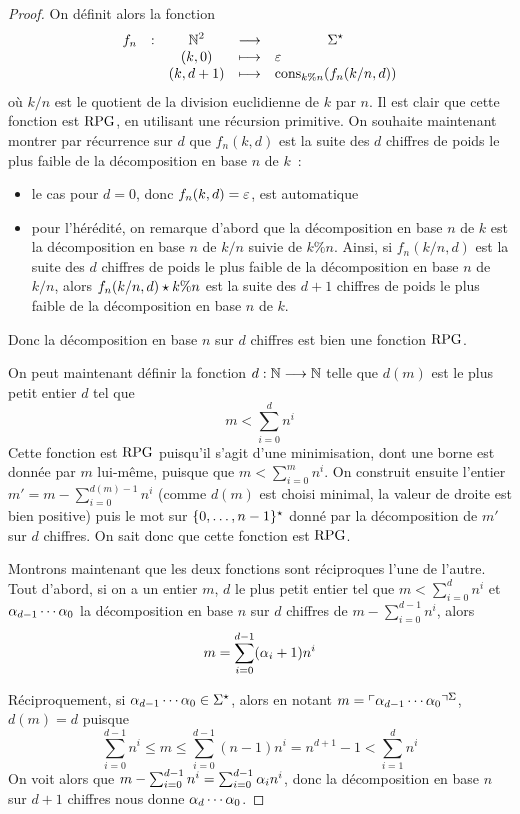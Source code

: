 \begin{proof}
  On définit alors la fonction
  \[\makeFunBis{f_n}{\bN^2}{\toStA}
               {(k,0)}{\Ewd}
               {(k,d+1)}{\consP{k\%n}(f_n(k/n,d))}\]
  où $k/n$ est le quotient de la division euclidienne de $k$ par $n$. Il est
  clair que cette fonction est $\operatorname{RPG}$, en utilisant une récursion primitive. On
  souhaite maintenant montrer par récurrence sur $d$ que
  $f_n(k,d)$ est la suite des $d$ chiffres de poids le plus faible de la
  décomposition en base $n$ de $k$~:
  \begin{itemize}
  \item le cas pour $d = 0$, donc $f_n(k,d) = \varepsilon$, est automatique
  \item pour l'hérédité, on remarque d'abord que la décomposition en base
    $n$ de $k$ est la décomposition en base $n$ de $k/n$ suivie de $k \% n$.
    Ainsi, si $f_n(k/n,d)$ est la suite des $d$ chiffres de poids le plus faible
    de la décomposition en base $n$ de $k/n$, alors $f_n(k/n,d)\mathbin{\star} k\%n$ est
    la suite des $d + 1$ chiffres de poids le plus faible de la décomposition en
    base $n$ de $k$.
  \end{itemize}
  Donc la décomposition en base $n$ sur $d$ chiffres est bien une fonction
  $\operatorname{RPG}$.

  On peut maintenant définir la fonction $d : \displaystyle \mathbb N \longrightarrow \mathbb N$ telle que
  $d(m)$ est le plus petit entier $d$ tel que
  \[m < \sum_{i = 0}^d n^i\]
  Cette fonction est $\operatorname{RPG}$ puisqu'il s'agit d'une minimisation, dont une borne
  est donnée par $m$ lui-même, puisque que $m < \sum_{i = 0}^m n^i$.
  On construit ensuite l'entier $m' = m - \sum_{i = 0}^{d(m)-1} n^i$ (comme $d(m)$
  est choisi minimal, la valeur de droite est bien positive) puis le
  mot sur $\{0,\ldots,n - 1\}^{\star}$ donné par la décomposition de $m'$ sur $d$
  chiffres. On sait donc que cette fonction est $\operatorname{RPG}$.
  
  Montrons maintenant que les deux fonctions sont réciproques l'une de l'autre.
  Tout d'abord, si on a un entier $m$, $d$ le plus petit entier tel que
  $m < \sum_{i = 0}^d n^i$ et $\alpha_{d-1}\cdots \alpha_0$ la décomposition en
  base $n$ sur $d$ chiffres de $m - \sum_{i = 0}^{d-1}n^i$, alors
  \[m = \sum_{i=0}^{d-1} (\alpha_i + 1)n^i\]
  
  Réciproquement, si $\alpha_{d-1}\cdots \alpha_0\in \Sigma^{\star}$, alors en notant
  $m = \ulcorner\alpha_{d-1}\cdots \alpha_0\urcorner^{\Sigma}$, $d(m) = d$ puisque
  \[\sum_{i = 0}^{d-1} n^i \leq m \leq \sum_{i = 0}^{d-1} (n-1)n^i = n^{d+1} - 1 <
  \sum_{i = 1}^{d} n^i\]
  On voit alors que $m - \sum_{i = 0}^{d- 1} n^i = \sum_{i = 0}^{d-1} \alpha_i n^i$,
  donc la décomposition en base $n$ sur $d+1$ chiffres nous donne
  $\alpha_d\cdots \alpha_0$.
\end{proof}

